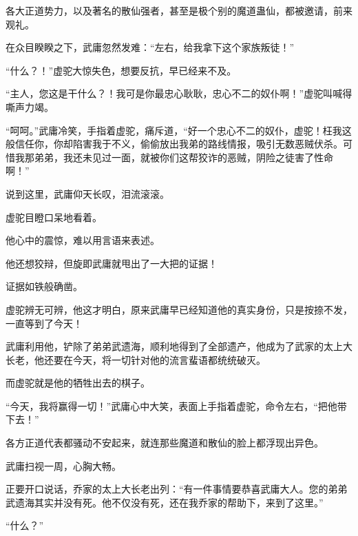 \begin{this_body}
各大正道势力，以及著名的散仙强者，甚至是极个别的魔道蛊仙，都被邀请，前来观礼。

在众目睽睽之下，武庸忽然发难：“左右，给我拿下这个家族叛徒！”

“什么？！”虚驼大惊失色，想要反抗，早已经来不及。

“主人，您这是干什么？！我可是你最忠心耿耿，忠心不二的奴仆啊！”虚驼叫喊得嘶声力竭。

“呵呵。”武庸冷笑，手指着虚驼，痛斥道，“好一个忠心不二的奴仆，虚驼！枉我这般信任你，你却陷害我于不义，偷偷放出我弟的路线情报，吸引无数恶贼伏杀。可惜我那弟弟，我还未见过一面，就被你们这帮狡诈的恶贼，阴险之徒害了性命啊！”

说到这里，武庸仰天长叹，泪流滚滚。

虚驼目瞪口呆地看着。

他心中的震惊，难以用言语来表述。

他还想狡辩，但旋即武庸就甩出了一大把的证据！

证据如铁般确凿。

虚驼辨无可辨，他这才明白，原来武庸早已经知道他的真实身份，只是按捺不发，一直等到了今天！

武庸利用他，铲除了弟弟武遗海，顺利地得到了全部遗产，他成为了武家的太上大长老，他还要在今天，将一切针对他的流言蜚语都统统破灭。

而虚驼就是他的牺牲出去的棋子。

“今天，我将赢得一切！”武庸心中大笑，表面上手指着虚驼，命令左右，“把他带下去！”

各方正道代表都骚动不安起来，就连那些魔道和散仙的脸上都浮现出异色。

武庸扫视一周，心胸大畅。

正要开口说话，乔家的太上大长老出列：“有一件事情要恭喜武庸大人。您的弟弟武遗海其实并没有死。他不仅没有死，还在我乔家的帮助下，来到了这里。”

“什么？”

\end{this_body}

